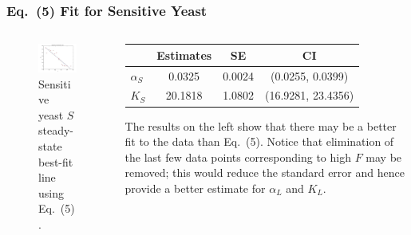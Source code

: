 \documentclass{beamer}
\begin{document}
\begin{frame}
  \frametitle{Eq.\ (5) Fit for Sensitive Yeast}
  \begin{columns}
  \begin{column}{0.4\textwidth}
  \begin{figure}[H]
    \centering
      \includegraphics[width=1.0\textwidth]{../doc/images/sensitiveFit.jpg}
    \caption{\footnotesize Sensitive yeast $S$ steady-state best-fit line using Eq.\ (5).}
  \end{figure}
  \end{column}
  \begin{column}{0.6\textwidth}
  \footnotesize
  \begin{center}
  \begin{tabular}{l | c c c}
    & Estimates & SE & CI \\ 
    \hline
    $\alpha_S$ & 0.0325  & 0.0024 & (0.0255,  0.0399) \\
    $K_S$      & 20.1818 & 1.0802 & (16.9281, 23.4356) \\
  \end{tabular}
  \end{center}
  \normalsize
  The results on the left show that there may be a better fit to the data than Eq.\ (5).  Notice that elimination of the last few data points corresponding to high $F$ may be removed; this would reduce the standard error and hence provide a better estimate for $\alpha_L$ and $K_L$.
  \end{column}
  \end{columns}
\end{frame}
\end{document}
